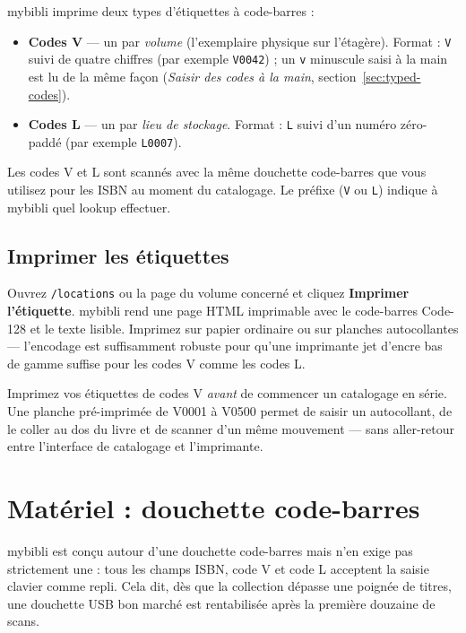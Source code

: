 mybibli imprime deux types d'étiquettes à code-barres :

\begin{itemize}
  \item \textbf{Codes V} — un par
        \emph{volume} (l'exemplaire physique sur
        l'étagère). Format : \texttt{V} suivi de quatre chiffres
        (par exemple \texttt{V0042}) ; un \texttt{v} minuscule saisi à
        la main est lu de la même façon (\emph{Saisir des codes à la
        main}, section~\ref{sec:typed-codes}).
  \item \textbf{Codes L} — un par \emph{lieu de
        stockage}. Format : \texttt{L} suivi d'un numéro zéro-paddé
        (par exemple \texttt{L0007}).
\end{itemize}

Les codes V et L sont scannés avec la même douchette code-barres que
vous utilisez pour les ISBN au moment du catalogage. Le préfixe
(\texttt{V} ou \texttt{L}) indique à mybibli quel lookup effectuer.

\subsection*{Imprimer les étiquettes}

Ouvrez \texttt{/locations} ou la page du volume concerné et cliquez
\textbf{Imprimer l'étiquette}. mybibli rend une page HTML
imprimable avec le code-barres Code-128 et le texte lisible. Imprimez
sur papier ordinaire ou sur planches autocollantes — l'encodage est
suffisamment robuste pour qu'une imprimante jet d'encre bas de gamme
suffise pour les codes V comme les codes L.

\begin{tip}
Imprimez vos étiquettes de codes V \emph{avant} de commencer un
catalogage en série. Une planche pré-imprimée de V0001 à V0500
permet de saisir un autocollant, de le coller au dos du livre et de
scanner d'un même mouvement — sans aller-retour entre l'interface
de catalogage et l'imprimante.
\end{tip}

\section{Matériel : douchette code-barres}\label{sec:scanner-hardware}

mybibli est conçu autour d'une douchette code-barres mais n'en exige
pas strictement une : tous les champs ISBN, code V et code L
acceptent la saisie clavier comme repli. Cela dit, dès que la
collection dépasse une poignée de titres, une douchette USB
bon marché est rentabilisée après la première douzaine de scans.

